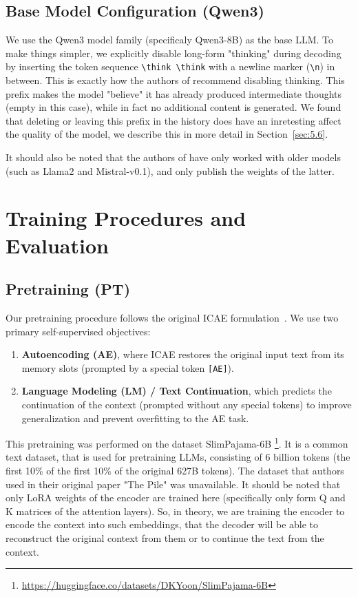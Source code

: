 \subsection{Base Model Configuration (Qwen3)}
We use the Qwen3 model family (specificaly Qwen3-8B) as the base LLM. 
To make things simpler, we explicitly disable long-form "thinking" during decoding by inserting the token sequence \texttt{\textbackslash think \textbackslash think} with a newline marker (\texttt{\textbackslash n}) in between.
This is exactly how the authors of \cite{qwen3} recommend disabling thinking.
This prefix makes the model "believe" it has already produced intermediate thoughts (empty in this case), while in fact no additional content is generated.
We found that deleting or leaving this prefix in the history does have an inretesting affect the quality of the model, we describe this in more detail in Section~\ref{sec:5.6}.

It should also be noted that the authors of \cite{ge_context_2024} have only worked with older models (such as Llama2 and Mistral-v0.1), and only publish the weights of the latter.


\section{Training Procedures and Evaluation}

\subsection{Pretraining (PT)}
Our pretraining procedure follows the original ICAE formulation~\cite{ge_-context_2024}.
We use two primary self-supervised objectives:
\begin{enumerate}[label=(\roman*)]
    \item \textbf{Autoencoding (AE)}, where ICAE restores the original input text from its memory slots (prompted by a special token \texttt{[AE]}).
    \item \textbf{Language Modeling (LM) / Text Continuation}, which predicts the continuation of the context (prompted without any special tokens) to improve generalization and prevent overfitting to the AE task.
\end{enumerate}
This pretraining was performed on the dataset SlimPajama-6B \cite{pajama6b}\footnote{\url{https://huggingface.co/datasets/DKYoon/SlimPajama-6B}}.
It is a common text dataset, that is used for pretraining LLMs, consisting of 6 billion tokens (the first 10\% of the first 10\% of the original 627B tokens).
The dataset that authors used in their original paper "The Pile" was unavailable.
It should be noted that only LoRA weights of the encoder are trained here (specifically only form Q and K matrices of the attention layers).
So, in theory, we are training the encoder to encode the context into such embeddings, that the decoder will be able to reconstruct the original context from them or to continue the text from the context.

